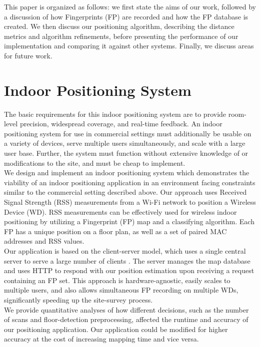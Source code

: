 \documentclass[conference]{IEEEtran}
\begin{document}
\indent This paper is organized as follows: we first state the aims of our work, followed by a discussion of how Fingerprints (FP) are recorded and how the FP database is created. We then discuss our positioning algorithm, describing the distance metrics and algorithm refinements, before presenting the performance of our implementation and comparing it against other systems. Finally, we discuss areas for future work.

\section{Indoor Positioning System}
The basic requirements for this indoor positioning system are to provide room-level precision, widespread coverage, and real-time feedback. An indoor positioning system for use in commercial settings must additionally be usable on a variety of devices, serve multiple users simultaneously, and scale with a large user base. Further, the system must function without extensive knowledge of or modifications to the site, and must be cheap to implement. \\
\indent We design and implement an indoor positioning system which demonstrates the viability of an indoor positioning application in an environment facing constraints similar to the commercial setting described above. Our approach uses Received Signal Strength (RSS) measurements from a Wi-Fi network to position a Wireless Device (WD). RSS measurements can be effectively used for wireless indoor positioning by utilizing a Fingerprint (FP) map and a classifying algorithm. Each FP has a unique position on a floor plan, as well as a set of paired MAC addresses and RSS values.\\
\indent Our application is based on the client-server model, which uses a single central server to serve a large number of clients \cite{Fielding}. The server manages the map database and uses HTTP to respond with our position estimation upon receiving a request containing an FP set. This approach is hardware-agnostic, easily scales to multiple users, and also allows simultaneous FP recording on multiple WDs, significantly speeding up the site-survey process.\\ 
\indent We provide quantitative analyses of how different decisions, such as the number of scans and floor-detection preprocessing, affected the runtime and accuracy of our positioning application. Our application could be modified for higher accuracy at the cost of increasing mapping time and vice versa.
\end{document}
